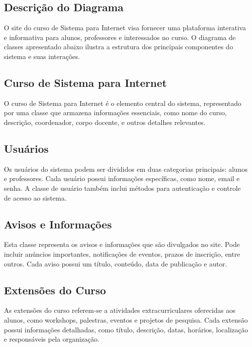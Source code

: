 \documentclass[a4paper,12pt]{report}
\begin{document}
\subsection{Descrição do Diagrama}
 
O site do curso de Sistema para Internet visa fornecer uma plataforma interativa e informativa para alunos, professores e interessados no curso. O diagrama de classes apresentado abaixo ilustra a estrutura dos principais componentes do sistema e suas interações.
 
\subsection{Curso de Sistema para Internet}
 
O curso de Sistema para Internet é o elemento central do sistema, representado por uma classe que armazena informações essenciais, como nome do curso, descrição, coordenador, corpo docente, e outros detalhes relevantes.
 
\subsection{Usuários}
 
Os usuários do sistema podem ser divididos em duas categorias principais: alunos e professores. Cada usuário possui informações específicas, como nome, email e senha. A classe de usuário também inclui métodos para autenticação e controle de acesso ao sistema.
 
\subsection{Avisos e Informações}
 
Esta classe representa os avisos e informações que são divulgados no site. Pode incluir anúncios importantes, notificações de eventos, prazos de inscrição, entre outros. Cada aviso possui um título, conteúdo, data de publicação e autor.
 
\subsection{Extensões do Curso}
 
As extensões do curso referem-se a atividades extracurriculares oferecidas aos alunos, como workshops, palestras, eventos e projetos de pesquisa. Cada extensão possui informações detalhadas, como título, descrição, datas, horários, localização e responsáveis pela organização.
 
\end{document}
